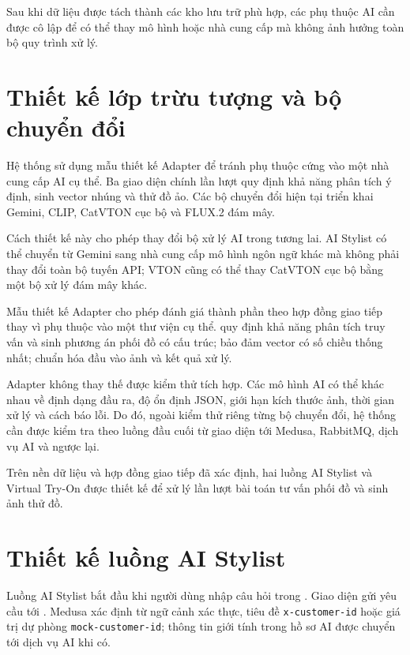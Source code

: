 \medskip

Sau khi dữ liệu được tách thành các kho lưu trữ phù hợp, các phụ thuộc AI cần được cô lập để có thể thay mô hình hoặc nhà cung cấp mà không ảnh hưởng toàn bộ quy trình xử lý.

\section{Thiết kế lớp trừu tượng và bộ chuyển đổi}

Hệ thống sử dụng mẫu thiết kế Adapter để tránh phụ thuộc cứng vào một nhà cung cấp AI cụ thể. Ba giao diện chính lần lượt quy định khả năng phân tích ý định, sinh vector nhúng và thử đồ ảo. Các bộ chuyển đổi hiện tại triển khai Gemini, CLIP, CatVTON cục bộ và FLUX.2 đám mây.

\medskip

Cách thiết kế này cho phép thay đổi bộ xử lý AI trong tương lai. AI Stylist có thể chuyển từ Gemini sang nhà cung cấp mô hình ngôn ngữ khác mà không phải thay đổi toàn bộ tuyến API; VTON cũng có thể thay CatVTON cục bộ bằng một bộ xử lý đám mây khác.

\medskip

Mẫu thiết kế Adapter cho phép đánh giá thành phần theo hợp đồng giao tiếp thay vì phụ thuộc vào một thư viện cụ thể.  quy định khả năng phân tích truy vấn và sinh phương án phối đồ có cấu trúc;  bảo đảm vector có số chiều thống nhất;  chuẩn hóa đầu vào ảnh và kết quả xử lý.

\medskip

Adapter không thay thế được kiểm thử tích hợp. Các mô hình AI có thể khác nhau về định dạng đầu ra, độ ổn định JSON, giới hạn kích thước ảnh, thời gian xử lý và cách báo lỗi. Do đó, ngoài kiểm thử riêng từng bộ chuyển đổi, hệ thống cần được kiểm tra theo luồng đầu cuối từ giao diện tới Medusa, RabbitMQ, dịch vụ AI và ngược lại.

\medskip

Trên nền dữ liệu và hợp đồng giao tiếp đã xác định, hai luồng AI Stylist và Virtual Try-On được thiết kế để xử lý lần lượt bài toán tư vấn phối đồ và sinh ảnh thử đồ.

\section{Thiết kế luồng AI Stylist}

Luồng AI Stylist bắt đầu khi người dùng nhập câu hỏi trong . Giao diện gửi yêu cầu tới . Medusa xác định  từ ngữ cảnh xác thực, tiêu đề \mbox{\texttt{x-customer-id}} hoặc giá trị dự phòng \mbox{\texttt{mock-customer-id}}; thông tin giới tính trong hồ sơ AI được chuyển tới dịch vụ AI khi có.

